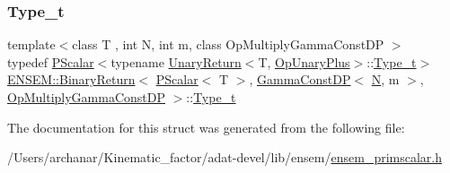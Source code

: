 \subsubsection{\texorpdfstring{Type\_t}{Type\_t}\hspace{0.1cm}{\footnotesize\ttfamily [3/3]}}
{\footnotesize\ttfamily template$<$class T , int N, int m, class Op\+Multiply\+Gamma\+Const\+DP $>$ \\
typedef \mbox{\hyperlink{classENSEM_1_1PScalar}{P\+Scalar}}$<$typename \mbox{\hyperlink{structENSEM_1_1UnaryReturn}{Unary\+Return}}$<$T, \mbox{\hyperlink{structENSEM_1_1OpUnaryPlus}{Op\+Unary\+Plus}}$>$\+::\mbox{\hyperlink{structENSEM_1_1BinaryReturn_3_01PScalar_3_01T_01_4_00_01GammaConstDP_3_01N_00_01m_01_4_00_01OpMultiplyGammaConstDP_01_4_a2d09643dd07c1169c27bfa1fb1582461}{Type\+\_\+t}}$>$ \mbox{\hyperlink{structENSEM_1_1BinaryReturn}{E\+N\+S\+E\+M\+::\+Binary\+Return}}$<$ \mbox{\hyperlink{classENSEM_1_1PScalar}{P\+Scalar}}$<$ T $>$, \mbox{\hyperlink{classENSEM_1_1GammaConstDP}{Gamma\+Const\+DP}}$<$ \mbox{\hyperlink{adat__devel_2lib_2hadron_2operator__name__util_8cc_a7722c8ecbb62d99aee7ce68b1752f337}{N}}, m $>$, \mbox{\hyperlink{structENSEM_1_1OpMultiplyGammaConstDP}{Op\+Multiply\+Gamma\+Const\+DP}} $>$\+::\mbox{\hyperlink{structENSEM_1_1BinaryReturn_3_01PScalar_3_01T_01_4_00_01GammaConstDP_3_01N_00_01m_01_4_00_01OpMultiplyGammaConstDP_01_4_a2d09643dd07c1169c27bfa1fb1582461}{Type\+\_\+t}}}



The documentation for this struct was generated from the following file\+:\begin{DoxyCompactItemize}
\item 
/\+Users/archanar/\+Kinematic\+\_\+factor/adat-\/devel/lib/ensem/\mbox{\hyperlink{adat-devel_2lib_2ensem_2ensem__primscalar_8h}{ensem\+\_\+primscalar.\+h}}\end{DoxyCompactItemize}
